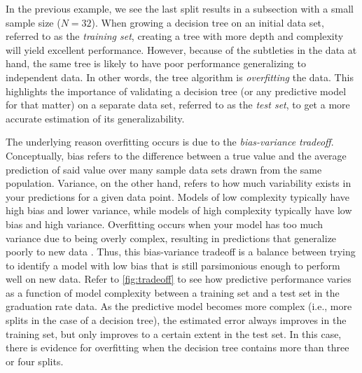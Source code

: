 	In the previous example, we see the last split results in a subsection with a small sample size ($N = 32$). When growing a decision tree on an initial data set, referred to as the \textit{training set}, creating a tree with more depth and complexity will yield excellent performance. However, because of the subtleties in the data at hand, the same tree is likely to have poor performance generalizing to independent data. In other words, the tree algorithm is \textit{overfitting} the data. This highlights the importance of validating a decision tree (or any predictive model for that matter) on a separate data set, referred to as the \textit{test set}, to get a more accurate estimation of its generalizability.


	The underlying reason overfitting occurs is due to the \textit{bias-variance tradeoff}. Conceptually, bias refers to the difference between a true value and the average prediction of said value over many sample data sets drawn from the same population. Variance, on the other hand, refers to how much variability exists in your predictions for a given data point. Models of low complexity typically have high bias and lower variance, while models of high complexity typically have low bias and high variance. Overfitting occurs when your model has too much variance due to being overly complex, resulting in predictions that generalize poorly to new data \cite{hastie2009elements}. Thus, this bias-variance tradeoff is a balance between trying to identify a model with low bias that is still parsimonious enough to perform well on new data. Refer to \autoref{fig:tradeoff} to see how predictive performance varies as a function of model complexity between a training set and a test set in the graduation rate data. As the predictive model becomes more complex (i.e., more splits in the case of a decision tree), the estimated error always improves in the training set, but only improves to a certain extent in the test set. In this case, there is evidence for overfitting when the decision tree contains more than three or four splits. 


